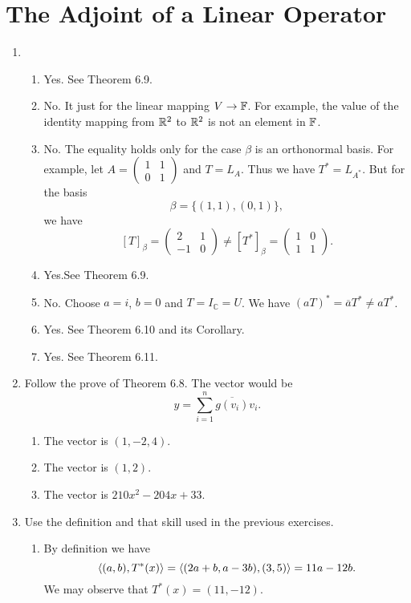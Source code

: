 \section{The Adjoint of a Linear Operator}
\begin{enumerate}
\item \begin{enumerate}
\item Yes. See Theorem 6.9.
\item No. It just for the linear mapping $V\rightarrow \mathbb{F}$. For example, the value of the identity mapping from $\mathbb{R}^2$ to $\mathbb{R}^2$ is not an element in $\mathbb{F}$.
\item No. The equality holds only for the case $\beta $ is an orthonormal basis. For example, let $A=\begin{pmatrix}1&1\\0&1\end{pmatrix}$ and $T=L_A$. Thus we have $T^*=L_{A^*}$. But for the basis 
\[\beta =\{(1,1),(0,1)\},\]
we have 
\[[T]_{\beta}=\begin{pmatrix}2&1\\-1&0\end{pmatrix}\neq [T^*]_{\beta}=\begin{pmatrix}1&0\\1&1\end{pmatrix}.\]
\item Yes.See Theorem 6.9.
\item No. Choose $a=i$, $b=0$ and $T=I_{\mathbb{C}}=U$. We have $(aT)^*=\overline{a}T^*\neq aT^*$.
\item Yes. See Theorem 6.10 and its Corollary.
\item Yes. See Theorem 6.11.
\end{enumerate}
\item Follow the prove of Theorem 6.8. The vector would be 
\[y=\sum_{i=1}^n{\overline{g(v_i)}v_i}.\]
\begin{enumerate}
\item The vector is $(1,-2,4)$.
\item The vector is $(1,2)$.
\item The vector is $210x^2-204x+33$.
\end{enumerate}
\item Use the definition and that skill used in the previous exercises.
\begin{enumerate}
\item By definition we have 
\[\langle (a,b),T^*(x)\rangle =\langle (2a+b,a-3b),(3,5)\rangle =11a-12b.\]
We may observe that $T^*(x)=(11,-12)$.

\end{enumerate}
\end{enumerate}
